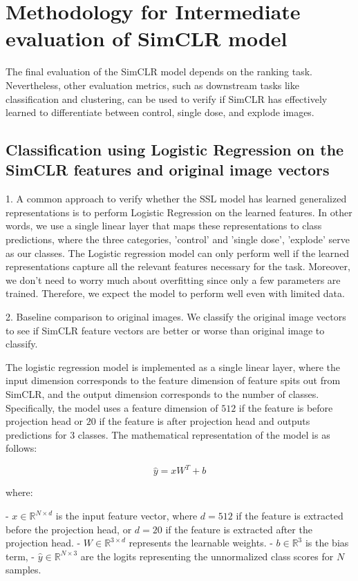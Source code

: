 \chapter{Methodology for Intermediate evaluation of SimCLR model}\label{ch:Methodology for Intermediate evaluation of SimCLR model}

The final evaluation of the SimCLR model depends on the ranking task. Nevertheless, other evaluation metrics, such as downstream tasks like classification and clustering, can be used to verify if SimCLR has effectively learned to differentiate between control, single dose, and explode images.

\section{Classification using Logistic Regression on the SimCLR features and original image vectors}
1. A common approach to verify whether the SSL model has learned generalized representations is to perform Logistic Regression on the learned features.
 In other words, we use a single linear layer that maps these representations to class predictions, where the three categories, 'control' and 'single dose', 'explode' serve as our classes. The Logistic regression model can only perform well if the learned representations capture all the relevant features necessary for the task. Moreover, we don't need to worry much about overfitting since only a few parameters are trained. Therefore, we expect the model to perform well even with limited data.
 

2. Baseline comparison to original images. We classify the original image vectors to see if SimCLR feature vectors are better or worse than original image to classify.

The logistic regression model is implemented as a single linear layer, where the input dimension corresponds to the feature dimension of feature spits out from SimCLR, and the 
output dimension corresponds to the number of classes. Specifically, the model uses a feature dimension of \(512\) if the feature is before projection head or  \(20\) if the
 feature is after projection head and outputs predictions for \(3\) classes. The mathematical representation of the model is as follows:

\[
\hat{y} = xW^T + b
\]

where:

- \(x \in \mathbb{R}^{N \times d}\) is the input feature vector, where \(d = 512\) if the feature is extracted before the projection head, or \(d = 20\) if the feature is 
extracted after the projection head.  
- \(W \in \mathbb{R}^{3 \times d}\) represents the learnable weights.  
- \(b \in \mathbb{R}^3\) is the bias term,
- \(\hat{y} \in \mathbb{R}^{N \times 3}\) are the logits representing the unnormalized class scores for \(N\) samples.

